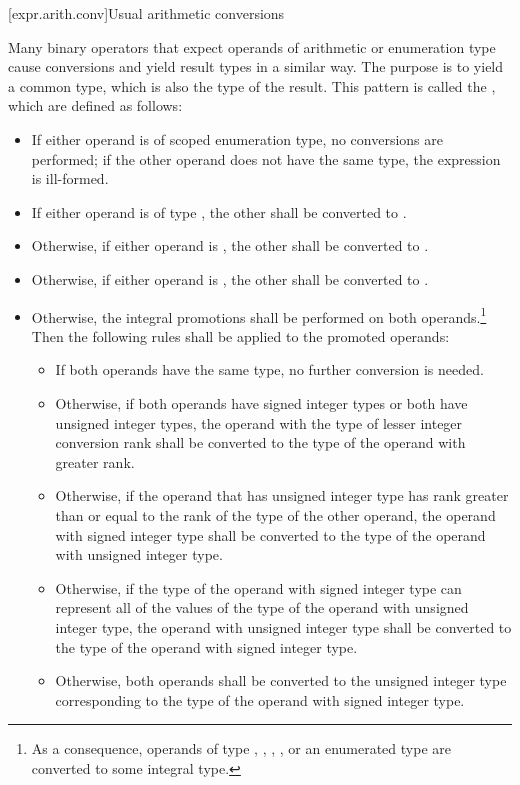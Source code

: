 [expr.arith.conv]{Usual arithmetic conversions}

\pnum
Many binary operators that expect operands of arithmetic or enumeration
type cause conversions and yield result types in a similar way. The
purpose is to yield a common type, which is also the type of the result.
This pattern is called the ,
which are defined as follows:

\begin{itemize}
\item If either operand is of scoped enumeration type, no conversions
are performed; if the other operand does not have the same type, the expression is
ill-formed.

\item If either operand is of type , the
other shall be converted to .

\item Otherwise, if either operand is , the other shall be
converted to .

\item Otherwise, if either operand is , the other shall be
converted to .

\item Otherwise, the integral promotions shall be
performed on both operands.\footnote{As a consequence, operands of type , ,
, , or an enumerated type are converted
to some integral type.}
Then the following rules shall be applied to the promoted operands:

\begin{itemize}

\item If both operands have the same type, no further conversion is
needed.

\item Otherwise, if both operands have signed integer types or both have
unsigned integer types, the operand with the type of lesser integer
conversion rank shall be converted to the type of the operand with
greater rank.

\item Otherwise, if the operand that has unsigned integer type has rank
greater than or equal to the rank of the type of the other operand, the
operand with signed integer type shall be converted to the type of the
operand with unsigned integer type.

\item Otherwise, if the type of the operand with signed integer type can
represent all of the values of the type of the operand with unsigned
integer type, the operand with unsigned integer type shall be converted
to the type of the operand with signed integer type.

\item Otherwise, both operands shall be converted to the unsigned
integer type corresponding to the type of the operand with signed
integer type.
\end{itemize}
\end{itemize}

